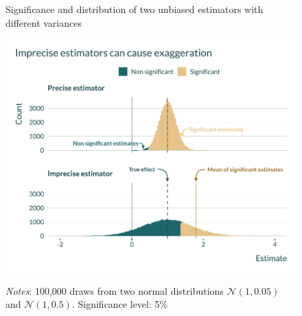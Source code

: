 			   \begin{figure}[!h]
				\begin{center}
					\caption{Significance and distribution of two unbiased estimators with different variances}
					\label{fig:graph_exag}
					\includegraphics[width=0.8\linewidth]{images/graph_intuition_precision.pdf}
					\caption*{\footnotesize \textit{Notes}: 100,000 draws from two normal distributions $\mathcal{N}(1, 0.05)$ and $\mathcal{N}(1, 0.5)$. Significance level: 5\%}
				\end{center}
				\vspace{-1cm}
			 \end{figure}
			
